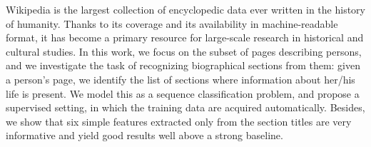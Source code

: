 Wikipedia is the largest collection of encyclopedic data ever written in the history of humanity. Thanks to its coverage and its availability in machine-readable format, it has become a primary resource for large-scale research in historical and cultural studies. In this work, we focus on the subset of pages describing persons, and we investigate the task of recognizing biographical sections from them: given a person's page, we identify the list of sections where information about her/his life is present. We model this as a sequence classification problem, and propose a supervised setting, in which the training data are acquired automatically. Besides, we show that six simple features extracted only from the section titles are very informative and yield good results well above a strong baseline.
